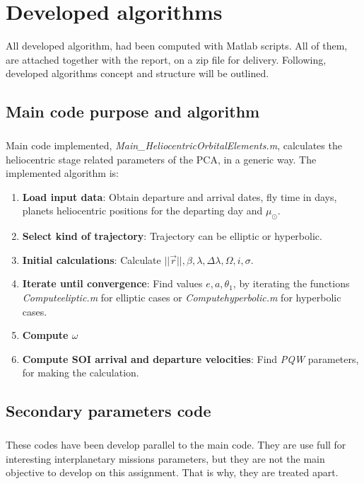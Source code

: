 \chapter{Developed algorithms}
All developed algorithm, had been computed with Matlab scripts. All of them, are attached together with the report, on a zip file for delivery. Following, developed algorithms concept and structure will be outlined.
	\section{Main code purpose and algorithm}
	\paragraph{} Main code implemented, \textit{Main\_HeliocentricOrbitalElements.m}, calculates the heliocentric stage related parameters of the PCA, in a generic way. The implemented algorithm is:
	\begin{enumerate}
		\item \textbf{Load input data}: Obtain departure and arrival dates, fly time in days, planets heliocentric positions for the departing day and $\mu_\odot$.
		\item \textbf{Select kind of trajectory}: Trajectory can be elliptic or hyperbolic.
		\item \textbf{Initial calculations}: Calculate $||\vec{r}||, \beta, \lambda, \Delta\lambda, \Omega, i, \sigma$.
		\item \textbf{Iterate until convergence}: Find values $e, a, \theta_1$, by iterating the functions \textit{Computeeliptic.m} for elliptic cases or \textit{Computehyperbolic.m} for hyperbolic cases.
		\item \textbf{Compute $\omega$}
		\item \textbf{Compute SOI arrival and departure velocities}: Find \textit{PQW} parameters, for making the calculation.
		
	\end{enumerate}

	\section{Secondary parameters code}
	\paragraph{} These codes have been develop parallel to the main code. They are use full for interesting interplanetary missions parameters, but they are not the main objective to develop on this assignment. That is why, they are treated apart.  
